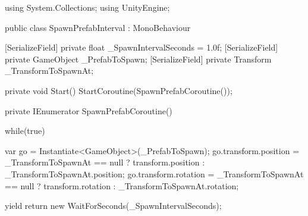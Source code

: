 \documentclass[11pt]{article}
\def\StartLineAt#1{\lstset{firstnumber=#1}}
\begin{document}
\StartLineAt{1}
\begin{csharp}
using System.Collections;
using UnityEngine;

public class SpawnPrefabInterval : MonoBehaviour
{
    [SerializeField]
    private float _SpawnIntervalSeconds = 1.0f;
    [SerializeField]
    private GameObject _PrefabToSpawn;
    [SerializeField]
    private Transform _TransformToSpawnAt;

    private void Start()
    {
        StartCoroutine(SpawnPrefabCoroutine());
    }

    private IEnumerator SpawnPrefabCoroutine()
    {
        while(true)
        {
            var go = Instantiate<GameObject>(_PrefabToSpawn);
            go.transform.position = _TransformToSpawnAt == null ? transform.position : _TransformToSpawnAt.position;
            go.transform.rotation = _TransformToSpawnAt == null ? transform.rotation : _TransformToSpawnAt.rotation;

            yield return new WaitForSeconds(_SpawnIntervalSeconds);
        }
    }
}
\end{csharp}
\end{document}
